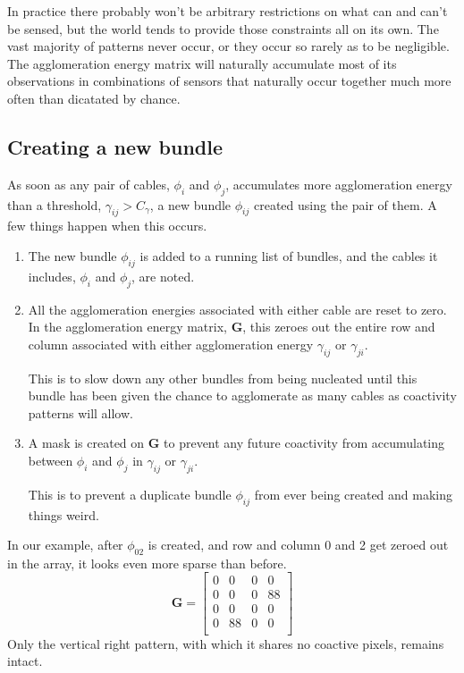 In practice there probably won't be arbitrary restrictions on what can
and can't be sensed, but the world tends to provide those constraints
all on its own.
The vast majority of patterns never occur, or they occur so rarely as
to be negligible. The agglomeration energy matrix will naturally
accumulate most of its observations in combinations of sensors that
naturally occur together much more often than dicatated by chance.

\subsection{Creating a new bundle}
\label{subsec:algobundling}

As soon as any pair of cables, $\phi_i$ and $\phi_j$,
accumulates more agglomeration energy than
a threshold, $\gamma_{ij} > C_\gamma$, a new bundle $\phi_{ij}$
created using the pair of them.
A few things happen when this occurs.

\begin{enumerate}
\item{The new bundle $\phi_{ij}$ is added to a running list of bundles,
  and the cables it includes, $\phi_i$ and $\phi_j$, are noted.}
\item{All the agglomeration energies associated with either cable are
  reset to zero. In the agglomeration energy matrix, $\mathbf{G}$,
  this zeroes out the entire row and column associated with either
  agglomeration energy $\gamma_{ij}$ or $\gamma_{ji}$.

  This is to slow down any other bundles from being nucleated until this
  bundle has been given the chance to agglomerate as many cables as
  coactivity patterns will allow.
}
\item{A mask is created on $\mathbf{G}$ to prevent any future coactivity from
  accumulating between $\phi_i$ and $\phi_j$ in
  $\gamma_{ij}$ or $\gamma_{ji}$.

  This is to prevent a duplicate bundle $\phi_{ij}$
  from ever being created and making things weird.
}
\end{enumerate}

In our example, after $\phi_{02}$ is created, and row and column 0 and 2
get zeroed out in the array, it looks even more sparse than before.
\begin{equation}
\mathbf{G} = 
\begin{bmatrix}
  0 & 0 & 0 & 0 \\
  0 & 0 & 0 & 88 \\
  0 & 0 & 0 & 0 \\
  0 & 88 & 0 & 0 \\
\end{bmatrix}
\end{equation}
Only the vertical right pattern, with which it shares no coactive pixels,
remains intact.


